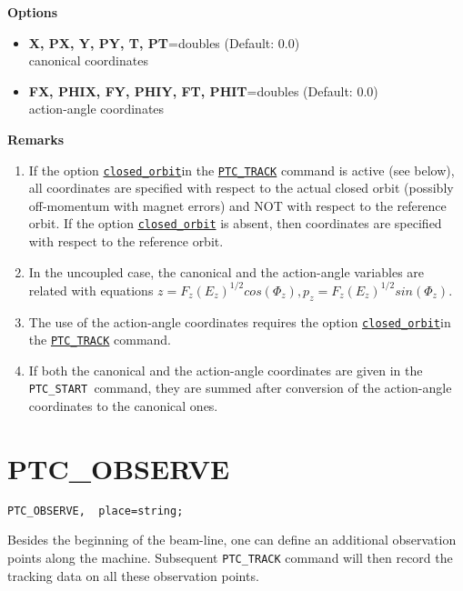 {\bf Options} \\ 
\begin{itemize}
   \item {\bf X, PX, Y, PY, T, PT}=doubles (Default: 0.0) \\
     canonical coordinates 
   \item {\bf FX, PHIX, FY, PHIY, FT, PHIT}=doubles (Default: 0.0) \\
     action-angle coordinates
\end{itemize}

{\bf Remarks} \\
\begin{enumerate}

   \item If the option
     \texttt{\hyperlink{CLOSED_ORBIT}{closed\_orbit}}in the
     \texttt{\hyperlink{PTC_TRACK}{PTC\_TRACK}} command is active (see
     below), all coordinates are specified with respect to the actual
     closed orbit (possibly off-momentum with magnet errors) and NOT
     with respect to the reference orbit. If the option
     \texttt{\hyperlink{CLOSED_ORBIT}{closed\_orbit}} is absent, then
     coordinates are specified with respect to the reference orbit. 

   \item In the uncoupled case, the canonical and the action-angle
     variables are related with equations 
     \( z = F_z (E_z)^{1/2} cos(\Phi_z),  p_z = F_z (E_z)^{1/2} sin(\Phi_z)\).

   \item The use of the action-angle coordinates requires the option
     \texttt{\hyperlink{CLOSED_ORBIT}{closed\_orbit}}in 
     the \texttt{\hyperlink{PTC_TRACK}{PTC\_TRACK}} command. 

   \item If both the canonical and the action-angle coordinates are 
     given in the \texttt{PTC\_START }command, they 
     are summed after conversion of the action-angle coordinates to 
     the canonical ones.
\end{enumerate}


\section{PTC\_OBSERVE} 

\begin{verbatim}
PTC_OBSERVE,  place=string; 
\end{verbatim}


Besides the beginning of the beam-line, one can define an additional
observation points along the machine. Subsequent \texttt{PTC\_TRACK}
command will then record the tracking data on all these observation
points.  

